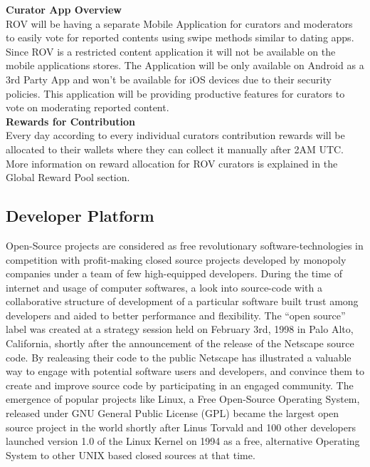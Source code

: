 \documentclass[10pt]{article}
\begin{document}
\textbf{Curator App Overview}\\

ROV will be having a separate Mobile Application for curators and moderators to easily vote for reported contents using swipe methods similar to dating apps. Since ROV is a restricted content application it will not be available on the mobile applications stores. The Application will be only available on Android as a 3rd Party App and won’t be available for iOS devices due to their security policies. This application will be providing productive features for curators to vote on moderating reported content. \\


\textbf{Rewards for Contribution}\\

Every day according to every individual curators contribution rewards will be allocated to their wallets where they can collect it manually after 2AM UTC.  More information on reward allocation for ROV curators is explained in the Global Reward Pool section.\\

\newpage

\subsection{Developer Platform}

Open-Source projects are considered as free revolutionary software-technologies in competition with profit-making closed source projects developed by monopoly companies under a team of few high-equipped developers. During the time of internet and usage of computer softwares, a look into source-code with a collaborative structure of development of a particular software built trust among developers and aided to better performance and flexibility. The “open source” label was created at a strategy session held on February 3rd, 1998 in Palo Alto, California, shortly after the announcement of the release of the Netscape source code. By realeasing their code to the public Netscape has illustrated a valuable way to engage with potential software users and developers, and convince them to create and improve source code by participating in an engaged community. The emergence of popular projects like Linux, a Free Open-Source Operating System, released under GNU General Public License (GPL) became the largest open source project in the world shortly after Linus Torvald and 100 other developers launched version 1.0 of the Linux Kernel  on 1994 as a free, alternative Operating System to other UNIX based closed sources at that time.\\
\end{document}
